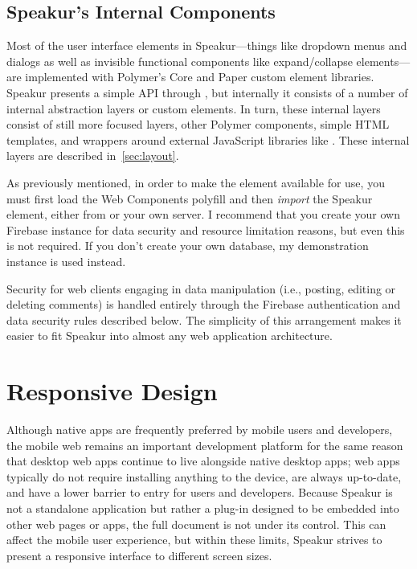 \subsection{Speakur's Internal Components}
Most of the user interface elements in Speakur---things like dropdown menus and dialogs as well as invisible functional components like expand/collapse elements---are implemented with Polymer's Core and Paper custom element libraries.
Speakur presents a simple API through ,
but internally it consists of a number of internal abstraction layers or custom elements.
In turn, these internal layers consist of still more focused layers, other Polymer components, 
simple HTML templates, 
and wrappers around external JavaScript libraries 
like .
These internal layers are described in~\cref{sec:layout}.

As previously mentioned, in order to make the 
 element available for use, 
you must first load the Web Components polyfill and then \textit{import} the Speakur element, 
either from  or your own server.
I recommend that you create your own Firebase instance for data security and resource limitation reasons, but even this is not required. 
If you don't create your own database, my demonstration instance is used instead.

Security for web clients engaging in data manipulation 
(i.e., posting, editing or deleting comments) 
is handled entirely through the Firebase authentication 
and data security rules described below.
The simplicity of this arrangement makes it easier to fit Speakur into almost any web application architecture.

\section{Responsive Design}
\label{bg:mobile}
Although native apps are frequently preferred by mobile users and developers, 
the mobile web remains an important development platform for the same reason that 
desktop web apps continue to live alongside native desktop apps; 
web apps typically do not require installing anything to the device, are always up-to-date, and have a lower barrier to entry for users and developers.
Because Speakur is not a standalone application but rather a plug-in designed to be embedded into other web pages or apps, 
the full document is not under its control.
This can affect the mobile user experience,
but within these limits, Speakur strives to present a responsive interface to different screen sizes.

